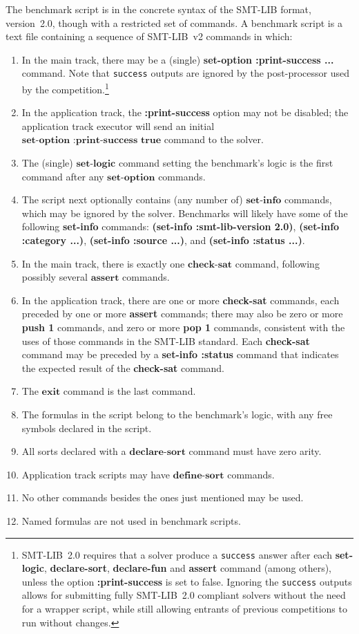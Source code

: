 \documentclass[12pt]{article}
\newcommand{\akey}[1]{\textbf{#1}}
\begin{document}
The benchmark script is in the concrete syntax of the SMT-LIB format,
version~2.0, though with a restricted set of commands.  A benchmark
script is a text file containing a sequence of SMT-LIB~v2 commands in
which:
%
\begin{enumerate}
\item In the main track, there may be a (single) \akey{set-option
  :print-success ...} command.  Note that {\tt success} outputs are
  ignored by the post-processor used by the
  competition.\footnote{SMT-LIB~2.0 requires that a solver produce a
    \texttt{success} answer after each \akey{set-logic},
    \akey{declare-sort}, \akey{declare-fun} and \akey{assert} command
    (among others), unless the option \akey{:print-success} is set to
    false.  Ignoring the \texttt{success} outputs allows for
    submitting fully SMT-LIB~2.0 compliant solvers without the need
    for a wrapper script, while still allowing entrants of previous
    competitions to run without changes.}
\item In the application track, the \akey{:print-success} option may
  not be disabled; the application track executor will send an initial
  $\akey{set-option :print-success true}$ command to the solver.
\item The (single) $\akey{set-logic}$ command setting the benchmark's
  logic is the first command after any $\akey{set-option}$ commands.
\item The script next optionally contains (any number of)
  $\akey{set-info}$ commands, which may be ignored by the
  solver. Benchmarks will likely have some of the following
  \akey{set-info} commands: \akey{(set-info :smt-lib-version 2.0)},
  \akey{(set-info :category ...)}, \akey{(set-info :source ...)}, and
  \akey{(set-info :status ...)}.
\item In the main track, there is exactly one $\akey{check-sat}$
  command, following possibly several $\akey{assert}$ commands.
\item In the application track, there are one or more \akey{check-sat}
  commands, each preceded by one or more \akey{assert} commands; there
  may also be zero or more \akey{push 1} commands, and zero or more
  \akey{pop 1} commands, consistent with the uses of those commands in
  the SMT-LIB standard. Each \akey{check-sat} command may be preceded
  by a \akey{set-info :status} command that indicates the expected
  result of the \akey{check-sat} command.
\item The $\akey{exit}$ command is the last command.
\item The formulas in the script belong to the benchmark's logic, with
  any free symbols declared in the script.
\item All sorts declared with a $\akey{declare-sort}$ command must
  have zero arity.
\item Application track scripts may have $\akey{define-sort}$
  commands.
\item No other commands besides the ones just mentioned may be used.
\item Named formulas are not used in benchmark scripts.
\end{enumerate}
\end{document}

